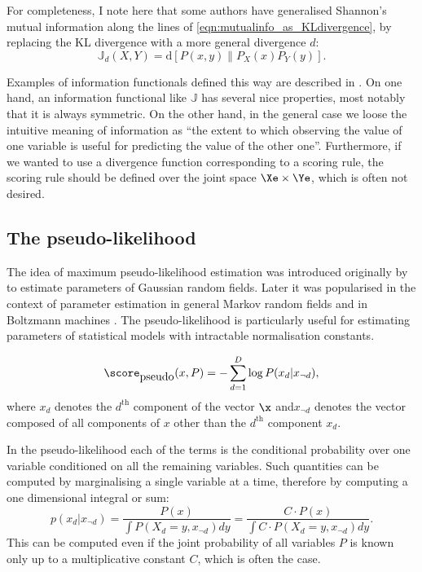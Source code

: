 For completeness, I note here that some authors have generalised Shannon's mutual information along the lines of \eqref{eqn:mutualinfo_as_KLdivergence}, by replacing the KL divergence with a more general divergence $d$:
%
\begin{equation}
	\mathbb{J}_{d}(X,Y) = \mbox{d}\left[ P(x,y) \middle\| P_{X}(x)P_{Y}(y) \right].\label{eqn:mutualinfo_generalisations}
\end{equation}

Examples of information functionals defined this way are described in \citep{Poczos2011}.
On one hand, an information functional like $\mathbb{J}$ has several nice properties, most notably that it is always symmetric. On the other hand, in the general case we loose the intuitive meaning of information as ``the extent to which observing the value of one variable is useful for predicting the value of the other one''. Furthermore, if we wanted to use a divergence function corresponding to a scoring rule, the scoring rule should be defined over the joint space $\Xe\times\Ye$, which is often not desired.

\subsection{The pseudo-likelihood\label{sec:pseudolikelihood}}

The idea of maximum pseudo-likelihood estimation was introduced originally by \citet{Besag1977} to estimate parameters of Gaussian random fields. Later it was popularised in the context of parameter estimation in general Markov random fields \citep{Comets1992} and in Boltzmann machines \citep{Hyvarinen2006}. The pseudo-likelihood is particularly useful for estimating parameters of statistical models with intractable normalisation constants.

\begin{equation}
	\score_{\mbox{pseudo}}(x,P) = - \sum_{d=1}^{D} \log P(x_d\vert x_{\neg d}),
\end{equation}
where $x_d$ denotes the $d^{\mbox{th}}$ component of the vector $\x$ and$x_{\neg d}$ denotes the vector composed of all components of $x$ other than the $d^{\mbox{th}}$ component $x_d$.

In the pseudo-likelihood each of the terms is the conditional probability over one variable conditioned on all the remaining variables. Such quantities can be computed by marginalising a single variable at a time, therefore by computing a one dimensional integral or sum:
%
\begin{equation}
	p(x_d\vert x_{\neg d}) = \frac{P(x)}{\int P(X_d=y,x_{\neg d}) dy} = \frac{C \cdot P(x)}{\int C \cdot P(X_d=y,x_{\neg d}) dy}.
\end{equation}
%
This can be computed even if the joint probability of all variables $P$ is known only up to a multiplicative constant $C$, which is often the case.

